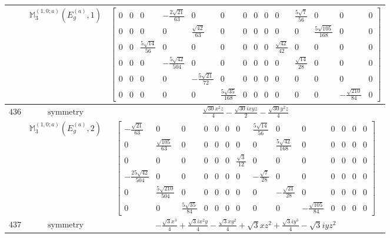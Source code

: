 \documentclass[fleqn,8pt,landscape]{jsarticle}
\begin{document}
\begin{longtable}{ccc}
$  $ & $ \mathbb{M}_{3}^{(1,0;a)}(E_{g}^{(a)},1) $ & $ \begin{bmatrix} 0 & 0 & 0 & - \frac{2 \sqrt{21}}{63} & 0 & 0 & 0 & 0 & 0 & 0 & \frac{5 \sqrt{7}}{56} & 0 & 0 & 0 \\ 0 & 0 & 0 & 0 & \frac{\sqrt{42}}{63} & 0 & 0 & 0 & 0 & 0 & 0 & \frac{5 \sqrt{105}}{168} & 0 & 0 \\ 0 & 0 & \frac{5 \sqrt{14}}{56} & 0 & 0 & 0 & 0 & 0 & 0 & \frac{\sqrt{42}}{42} & 0 & 0 & 0 & 0 \\ 0 & 0 & 0 & - \frac{5 \sqrt{42}}{504} & 0 & 0 & 0 & 0 & 0 & 0 & \frac{\sqrt{14}}{28} & 0 & 0 & 0 \\ 0 & 0 & 0 & 0 & - \frac{5 \sqrt{21}}{72} & 0 & 0 & 0 & 0 & 0 & 0 & 0 & 0 & 0 \\ 0 & 0 & 0 & 0 & 0 & \frac{5 \sqrt{35}}{168} & 0 & 0 & 0 & 0 & 0 & 0 & - \frac{\sqrt{210}}{84} & 0 \end{bmatrix} $ \\ \hline
$ 436 $ & $ \text{symmetry} $ & $ \frac{\sqrt{30} x^{2} z}{4} - \frac{\sqrt{30} i x y z}{2} - \frac{\sqrt{30} y^{2} z}{4} $ \\
$  $ & $ \mathbb{M}_{3}^{(1,0;a)}(E_{g}^{(a)},2) $ & $ \begin{bmatrix} - \frac{\sqrt{21}}{63} & 0 & 0 & 0 & 0 & 0 & 0 & \frac{5 \sqrt{14}}{56} & 0 & 0 & 0 & 0 & 0 & 0 \\ 0 & \frac{\sqrt{105}}{63} & 0 & 0 & 0 & 0 & 0 & 0 & \frac{5 \sqrt{42}}{168} & 0 & 0 & 0 & 0 & 0 \\ 0 & 0 & 0 & 0 & 0 & 0 & \frac{\sqrt{3}}{12} & 0 & 0 & 0 & 0 & 0 & 0 & 0 \\ - \frac{25 \sqrt{42}}{504} & 0 & 0 & 0 & 0 & 0 & 0 & - \frac{\sqrt{7}}{28} & 0 & 0 & 0 & 0 & 0 & 0 \\ 0 & \frac{5 \sqrt{210}}{504} & 0 & 0 & 0 & 0 & 0 & 0 & - \frac{\sqrt{21}}{28} & 0 & 0 & 0 & 0 & 0 \\ 0 & 0 & \frac{5 \sqrt{35}}{84} & 0 & 0 & 0 & 0 & 0 & 0 & - \frac{\sqrt{105}}{84} & 0 & 0 & 0 & 0 \end{bmatrix} $ \\ \hline
$ 437 $ & $ \text{symmetry} $ & $ - \frac{\sqrt{3} x^{3}}{4} + \frac{\sqrt{3} i x^{2} y}{4} - \frac{\sqrt{3} x y^{2}}{4} + \sqrt{3} x z^{2} + \frac{\sqrt{3} i y^{3}}{4} - \sqrt{3} i y z^{2} $ \\

\end{longtable}
\end{document}
